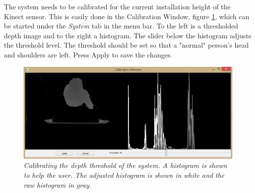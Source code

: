 
The system needs to be calibrated for the current installation height of the Kinect sensor. This is easily done in the Calibration Window, figure \ref{fig:Calibration}, which can be started under the \textit{System} tab in the menu bar. To the left is a thresholded depth image and to the right a histogram. The slider below the histogram adjusts the threshold level. The threshold should be set so that a "normal" person’s head and shoulders are left. Press Apply to save the changes. 

\begin{figure}[htb]
	\centering
	\includegraphics[width=\linewidth]{images/Calibration.png}
	\caption[Calibration Window]
	{\textit{Calibrating the depth threshold of the system. A histogram is shown to help the user. The adjusted histogram is shown in white and the raw histogram in gray.}}
	\label{fig:Calibration}  %
\end{figure}
